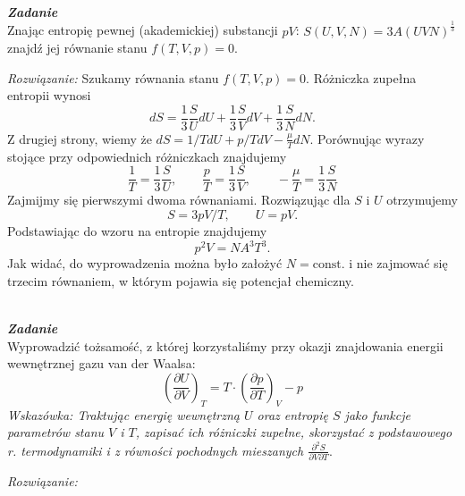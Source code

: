 \documentclass[11pt,a4paper]{article}
\newcounter{zadanie}\newcommand{\zadanie}[1][]{\addtocounter{zadanie}{1} ~\\  {\bf \emph{Zadanie \arabic{zadanie} #1 }} \\}
\newcommand{\dbar}{{\mkern3mu\mathchar'26\mkern-12mu d}}
\begin{document}
\newpage
\zadanie
Znając entropię pewnej (akademickiej) substancji $pV$: $S(U,V,N) = 3A(UVN)^\frac{1}{3}$ 
znajdź jej równanie stanu \mbox{$f(T,V,p)=0$.}

\vspace{5mm}
{\em Rozwiązanie:}
\newline
Szukamy równania stanu $f(T, V, p) =0$. Różniczka zupełna entropii wynosi
\begin{equation}
	dS = \frac{1}{3} \frac{S}{U} dU + \frac{1}{3} \frac{S}{V} dV +\frac{1}{3}\frac{S}{N}dN.
\end{equation}
Z drugiej strony, wiemy że $dS = 1/T dU + p/T dV-\frac{\mu}{T} dN$. Porównując wyrazy stojące przy odpowiednich różniczkach znajdujemy
\begin{equation}
	\frac{1}{T} = \frac{1}{3} \frac{S}{U}, \qquad \frac{p}{T} = \frac{1}{3} \frac{S}{V}, \qquad -\frac{\mu}{T}=\frac{1}{3}\frac{S}{N}
\end{equation}
Zajmijmy się pierwszymi dwoma równaniami. Rozwiązując dla $S$ i $U$ otrzymujemy
\begin{equation}
	S = 3 pV/T, \qquad U = pV.
\end{equation}
Podstawiając do wzoru na entropie znajdujemy
\begin{equation}
	p^2 V =N A^3 T^3.
\end{equation}
Jak widać, do wyprowadzenia można było założyć $N=\text{const.}$ i nie zajmować się trzecim równaniem, w którym pojawia się potencjał chemiczny.

\newpage


\zadanie
Wyprowadzić tożsamość, z której korzystaliśmy przy okazji znajdowania energii wewnętrznej gazu van der Waalsa:
\[ \left(\frac{\partial U}{\partial V}\right)_T = 
   T \cdot \left(\frac{\partial p}{\partial T}\right)_V - p \]
{\em Wskazówka: Traktując energię wewnętrzną $U$ oraz entropię $S$ 
jako funkcje parametrów stanu $V$ i $T$, zapisać ich różniczki zupełne,
skorzystać z podstawowego r. termodynamiki
i z równości pochodnych mieszanych $\frac{\partial^2 S}{\partial V\partial T}$}.


\vspace{5mm}
{\em Rozwiązanie:}
\end{document}

